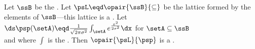
\begin{example}
Let $\ssB$ be the .
Let $\psL\eqd\opair{\ssB}{\subseteq}$ be the lattice formed by the elements of $\ssB$---this
lattice is a .
Let 
\\\indentx$\ds\psp(\setA)\eqd\frac{1}{\sqrt{2\pi\sigma^2}}\int_\setA e^{\frac{x^2}{2\sigma^2}}\dx$ for $\setA\subseteq\ssB$\\
and where $\int$ is the  .
Then $\opair{\psL}{\psp}$ is a . 
\end{example}

